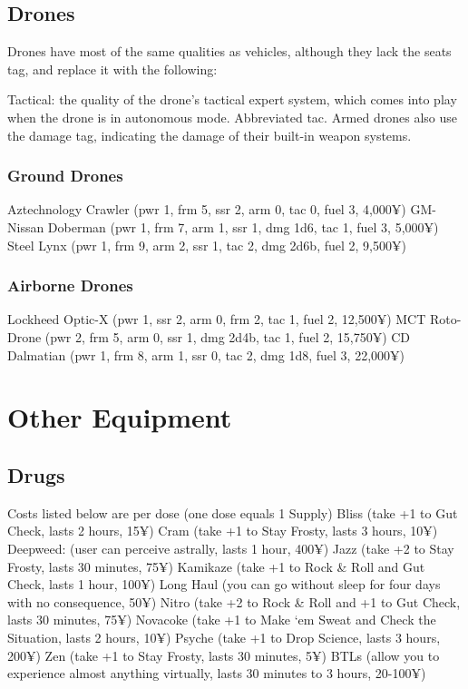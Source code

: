 \subsection{Drones}

Drones have most of the same qualities as vehicles, although they lack the seats tag, and replace it with the following:

Tactical: the quality of the drone’s tactical expert system, which comes into play when the drone is in autonomous mode. Abbreviated tac.
Armed drones also use the damage tag, indicating the damage of their built-in weapon systems.

\subsubsection{Ground Drones}
Aztechnology Crawler (pwr 1, frm 5, ssr 2, arm 0, tac 0, fuel 3, 4,000¥)
GM-Nissan Doberman (pwr 1, frm 7, arm 1, ssr 1, dmg 1d6, tac 1, fuel 3, 5,000¥)
Steel Lynx (pwr 1, frm 9, arm 2, ssr 1, tac 2, dmg 2d6b, fuel 2, 9,500¥)

\subsubsection{Airborne Drones}
Lockheed Optic-X (pwr 1, ssr 2, arm 0, frm 2, tac 1, fuel 2, 12,500¥)
MCT Roto-Drone (pwr 2, frm 5, arm 0, ssr 1, dmg 2d4b, tac 1, fuel 2, 15,750¥)
CD Dalmatian (pwr 1, frm 8, arm 1, ssr 0, tac 2, dmg 1d8, fuel 3, 22,000¥)



\section{Other Equipment}

\subsection{Drugs}

Costs listed below are per dose (one dose equals 1 Supply)
Bliss (take +1 to Gut Check, lasts 2 hours, 15¥)
Cram (take +1 to Stay Frosty, lasts 3 hours, 10¥)
Deepweed: (user can perceive astrally, lasts 1 hour, 400¥)
Jazz (take +2 to Stay Frosty, lasts 30 minutes, 75¥) Kamikaze (take +1 to Rock \& Roll and Gut Check, lasts 1 hour, 100¥)
Long Haul (you can go without sleep for four days with no consequence, 50¥)
Nitro (take +2 to Rock \& Roll and +1 to Gut Check, lasts 30 minutes, 75¥)
Novacoke (take +1 to Make ‘em Sweat and Check the Situation, lasts 2 hours, 10¥)
Psyche (take +1 to Drop Science, lasts 3 hours, 200¥)
Zen (take +1 to Stay Frosty, lasts 30 minutes, 5¥)
BTLs (allow you to experience almost anything virtually, lasts 30 minutes to 3 hours, 20-100¥)


